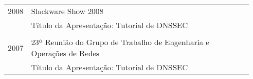 \documentclass[a4paper, oneside, final]{scrartcl}
\begin{document}
\begin{center}
\begin{tabularx}{0.97\linewidth}{p{2cm}X}
2008        & Slackware Show 2008\\
            & Título da Apresentação: Tutorial de DNSSEC\\ \\

2007        & 23ª Reunião do Grupo de Trabalho de Engenharia e Operações de Redes\\
            & Título da Apresentação: Tutorial de DNSSEC
\end{tabularx}


\end{center}
\end{document}
